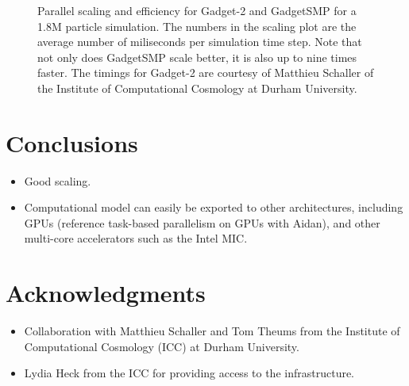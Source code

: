 \documentclass[final]{siamltex}
\begin{document}
\begin{figure}[ht]
    \centerline{}
    
    \caption{Parallel scaling and efficiency for Gadget-2 and GadgetSMP
        for a 1.8M particle simulation.
        The numbers in the scaling plot are the average number of miliseconds
        per simulation time step.
        Note that not only does GadgetSMP scale better, it is also up to nine
        times faster.
        The timings for Gadget-2 are courtesy of Matthieu Schaller of the
        Institute of Computational Cosmology at Durham University.}
    \label{fig:Results}
\end{figure}


\section{Conclusions}

\begin{itemize}

    \item Good scaling.
    
    \item Computational model can easily be exported to other architectures,
        including GPUs (reference task-based parallelism on GPUs with Aidan),
        and other multi-core accelerators such as the Intel MIC.
        
\end{itemize}


\section*{Acknowledgments}

\begin{itemize}

    \item Collaboration with Matthieu Schaller and Tom Theums from the
        Institute of Computational Cosmology (ICC) at Durham University.
        
    \item Lydia Heck from the ICC for providing access to the infrastructure.

\end{itemize}


\nopagebreak

\end{document}
